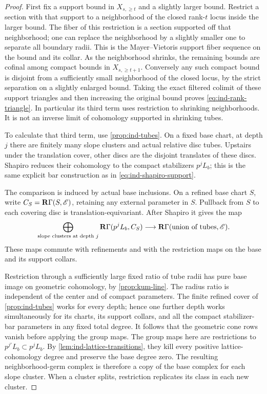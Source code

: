 \begin{proof}
First fix a support bound in $X_{s,\geq t}$ and a slightly larger
bound.  Restrict a section with that support to a neighborhood of
the closed rank-$t$ locus inside the larger bound.  The fiber of
this restriction is a section supported off that neighborhood;
one can replace the neighborhood by a slightly smaller one to
separate all boundary radii.  This is the Mayer--Vietoris support
fiber sequence on the bound and its collar.  As the neighborhood
shrinks, the remaining bounds are cofinal among compact bounds
in $X_{s,\geq t+1}$.  Conversely any such compact bound is
disjoint from a sufficiently small neighborhood of the closed
locus, by the strict separation on a slightly enlarged bound.
Taking the exact filtered colimit of these support triangles and
then increasing the original bound proves
\cref{eq:ind-rank-triangle}.  In particular its third term uses
restriction to shrinking neighborhoods.  It is not an inverse
limit of cohomology supported in shrinking tubes.

To calculate that third term, use \cref{prop:ind-tubes}.  On a
fixed base chart, at depth $j$ there are finitely many slope
clusters and actual relative disc tubes.  Upstairs under the
translation cover, other discs are the disjoint translates of
these discs.  Shapiro reduces their cohomology to the compact
stabilizers $p^jL_b$; this is the same explicit bar construction
as in \cref{eq:ind-shapiro-support}.

The comparison is induced by actual base inclusions.  On a refined
base chart $S$, write $C_S=\mathbf R\Gamma(S,\mathscr E)$, retaining any
external parameter in $S$.  Pullback from $S$ to each covering disc
is translation-equivariant.  After Shapiro it gives the map
\[
 \bigoplus_{\text{slope clusters at depth }j}
       \mathbf R\Gamma(p^jL_b,C_S)
       \longrightarrow \mathbf R\Gamma(\text{union of tubes},\mathscr E).
\]
These maps commute with refinements and with the restriction maps
on the base and its support collars.

Restriction through a sufficiently large fixed ratio of tube
radii has pure base image on geometric cohomology, by
\cref{prop:kum-line}.  The radius ratio is independent of the
center and of compact parameters.  The finite refined cover of
\cref{prop:ind-tubes} works for every depth; hence one further
depth works simultaneously for its charts, its support collars,
and all the compact stabilizer-bar parameters in any fixed total
degree.  It follows that the geometric cone rows vanish before
applying the group maps.  The group maps here are restrictions
to $p^{j'}L_b\subset p^jL_b$.  By
\cref{lem:ind-lattice-transitions}, they kill every positive
lattice-cohomology degree and preserve the base degree zero.
The resulting neighborhood-germ complex is therefore a copy of
the base complex for each slope cluster.  When a cluster splits,
restriction replicates its class in each new cluster.


\end{proof}
